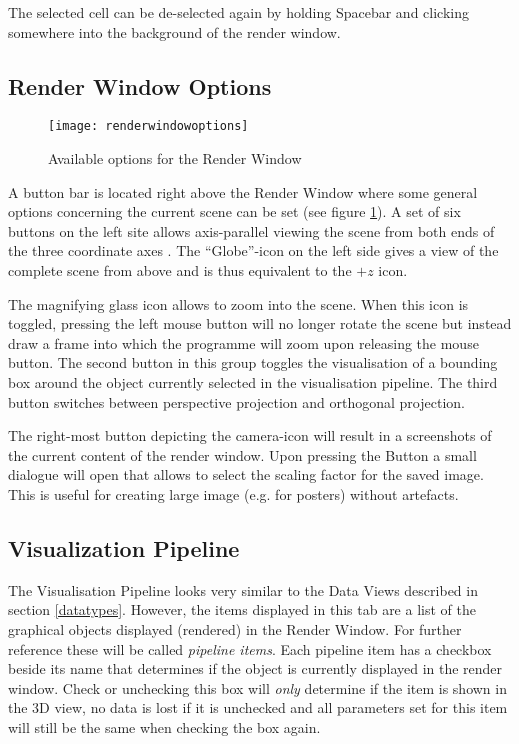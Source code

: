 The selected cell can be de-selected again by holding Spacebar and clicking somewhere into the background of the render window.

\subsection{Render Window Options}

\begin{figure}[tb]
\begin{center}
\texttt{[image: renderwindowoptions]}
\caption{Available options for the Render Window}
\label{fig:renderoptions}
\end{center}
\end{figure}

A button bar is located right above the Render Window where some general options concerning the current scene can be set (see figure \ref{fig:renderoptions}). A set of six buttons on the left site allows axis-parallel viewing the scene from both ends of the three coordinate axes . The ``Globe''-icon on the left side gives a view of the complete scene from above and is thus equivalent to the $+z$ icon.

The magnifying glass icon allows to zoom into the scene. When this icon is toggled, pressing the left mouse button will no longer rotate the scene but instead draw a frame into which the programme will zoom upon releasing the mouse button. The second button in this group toggles the visualisation of a bounding box around the object currently selected in the visualisation pipeline. The third button switches between perspective projection and orthogonal projection.

The right-most button depicting the camera-icon will result in a screenshots of the current content of the render window. Upon pressing the Button a small dialogue will open that allows to select the scaling factor for the saved image. This is useful for creating large image (e.g. for posters) without artefacts.

\subsection{Visualization Pipeline}

The Visualisation Pipeline looks very similar to the Data Views described in section \ref{datatypes}. However, the items displayed in this tab are a list of the graphical objects displayed (rendered) in the Render Window. For further reference these will be called \emph{pipeline items}. Each pipeline item has a checkbox beside its name that determines if the object is currently displayed in the render window. Check or unchecking this box will \emph{only} determine if the item is shown in the 3D view, no data is lost if it is unchecked and all parameters set for this item will still be the same when checking the box again.

